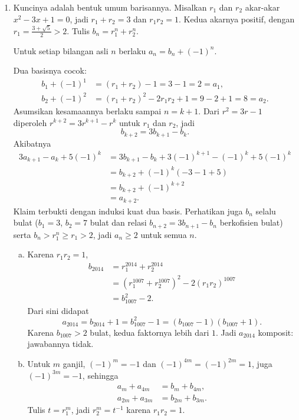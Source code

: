 \documentclass[12pt]{scrartcl}
\begin{document}
\begin{enumerate}[resume]
	\item Kuncinya adalah bentuk umum barisannya.
	Misalkan $r_1$ dan $r_2$ akar-akar $x^2 - 3x + 1 = 0$,
	jadi $r_1 + r_2 = 3$ dan $r_1 r_2 = 1$.
	Kedua akarnya positif, dengan $r_1 = \frac{3+\sqrt{5}}{2} > 2$.
	Tulis $b_n = r_1^n + r_2^n$.
	\begin{claim}
	Untuk setiap bilangan asli $n$ berlaku $a_n = b_n + (-1)^n$.
	\end{claim}
	Dua basisnya cocok:
	\begin{align*}
	b_1 + (-1)^1 &= (r_1 + r_2) - 1 = 3 - 1 = 2 = a_1, \\
	b_2 + (-1)^2 &= (r_1 + r_2)^2 - 2r_1r_2 + 1 = 9 - 2 + 1 = 8 = a_2.
	\end{align*}
	Asumsikan kesamaannya berlaku sampai $n = k+1$.
	Dari $r^2 = 3r - 1$ diperoleh $r^{k+2} = 3r^{k+1} - r^k$
	untuk $r_1$ dan $r_2$, jadi
	\[ b_{k+2} = 3b_{k+1} - b_k. \]
	Akibatnya
	\begin{align*}
	3a_{k+1} - a_k + 5(-1)^k
	&= 3b_{k+1} - b_k + 3(-1)^{k+1} - (-1)^k + 5(-1)^k \\
	&= b_{k+2} + (-1)^k(-3 - 1 + 5) \\
	&= b_{k+2} + (-1)^{k+2} \\
	&= a_{k+2}.
	\end{align*}
	Klaim terbukti dengan induksi kuat dua basis.
	Perhatikan juga $b_n$ selalu bulat ($b_1 = 3$, $b_2 = 7$ bulat
	dan relasi $b_{n+2} = 3b_{n+1} - b_n$ berkofisien bulat)
	serta $b_n > r_1^n \ge r_1 > 2$, jadi $a_n \ge 2$ untuk semua $n$.
	\begin{enumerate}[(a)]
		\item Karena $r_1 r_2 = 1$,
		\begin{align*}
		b_{2014} &= r_1^{2014} + r_2^{2014} \\
		&= (r_1^{1007} + r_2^{1007})^2 - 2(r_1r_2)^{1007} \\
		&= b_{1007}^2 - 2.
		\end{align*}
		Dari sini didapat
		\[ a_{2014} = b_{2014} + 1 = b_{1007}^2 - 1
		= (b_{1007} - 1)(b_{1007} + 1). \]
		Karena $b_{1007} > 2$ bulat, kedua faktornya lebih dari $1$.
		Jadi $a_{2014}$ komposit: jawabannya tidak.
		\item Untuk $m$ ganjil, $(-1)^m = -1$ dan $(-1)^{4m} = (-1)^{2m} = 1$,
		juga $(-1)^{3m} = -1$, sehingga
		\begin{align*}
		a_m + a_{4m} &= b_m + b_{4m}, \\
		a_{2m} + a_{3m} &= b_{2m} + b_{3m}.
	\end{align*}
		Tulis $t = r_1^m$, jadi $r_2^m = t^{-1}$ karena $r_1r_2 = 1$.

\end{enumerate}
\end{enumerate}
\end{document}
